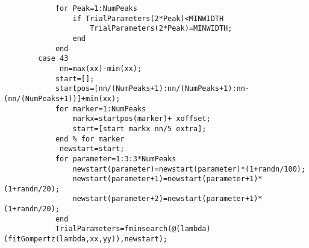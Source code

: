 \begin{lstlisting}
            for Peak=1:NumPeaks
                if TrialParameters(2*Peak)<MINWIDTH
                    TrialParameters(2*Peak)=MINWIDTH;
                end
            end
        case 43
             nn=max(xx)-min(xx);
            start=[];
            startpos=[nn/(NumPeaks+1):nn/(NumPeaks+1):nn-(nn/(NumPeaks+1))]+min(xx);
            for marker=1:NumPeaks
                markx=startpos(marker)+ xoffset;
                start=[start markx nn/5 extra];
            end % for marker
             newstart=start;
            for parameter=1:3:3*NumPeaks
                newstart(parameter)=newstart(parameter)*(1+randn/100);
                newstart(parameter+1)=newstart(parameter+1)*(1+randn/20);
                newstart(parameter+2)=newstart(parameter+1)*(1+randn/20);
            end
            TrialParameters=fminsearch(@(lambda)(fitGompertz(lambda,xx,yy)),newstart);


\end{lstlisting}
